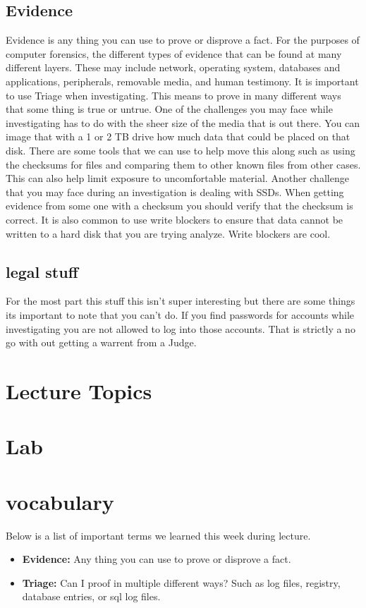 \documentclass[letterpaper, onecolumn,10pt]{IEEEtran}
\begin{document}
            \subsection{Evidence}
            Evidence is any thing you can use to prove or disprove a fact. For the purposes of computer forensics, the different types of evidence that can be found at many different layers. These may include network, operating system, databases and applications, peripherals, removable media, and human testimony. It is important to use Triage when investigating. This means to prove in many different ways that some thing is true or untrue. One of the challenges you may face while investigating has to do with the sheer size of the media that is out there. You can image that with a 1 or 2 TB drive how much data that could be placed on that disk. There are some tools that we can use to help move this along such as using the checksums for files and comparing them to other known files from other cases. This can also help limit exposure to uncomfortable material. Another challenge that you may face during an investigation is dealing with SSDs. When getting evidence from some one with a checksum you should verify that the checksum is correct. It is also common to use write blockers to ensure that data cannot be written to a hard disk that you are trying analyze. Write blockers are cool.\\
            
            \subsection{legal stuff} For the most part this stuff this isn't super interesting but there are some things its important to note that you can't do. If you find passwords for accounts while investigating you are not allowed to log into those accounts. That is strictly a no go with out getting a warrent from a Judge.\\
		
		\section{Lecture Topics}
		
		\section{Lab}

		\section{vocabulary}
		    Below is a list of important terms we learned this week during lecture.\\
		    \begin{itemize}
		        \item \textbf{Evidence: } Any thing you can use to prove or disprove a fact.\\
		        \item \textbf{Triage: } Can I proof in multiple different ways? Such as log files, registry, database entries, or sql log files.\\
		    \end{itemize}
		
\end{document}

